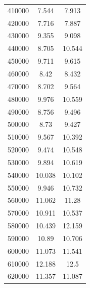 \documentclass{article}
\begin{document}
\begin{longtable}{c|c|c}
           410000 &                      7.544 &                      7.913 \\
           420000 &                      7.716 &                      7.887 \\
           430000 &                      9.355 &                      9.098 \\
           440000 &                      8.705 &                     10.544 \\
           450000 &                      9.711 &                      9.615 \\
           460000 &                      8.42  &                      8.432 \\
           470000 &                      8.702 &                      9.564 \\
           480000 &                      9.976 &                     10.559 \\
           490000 &                      8.756 &                      9.496 \\
           500000 &                      8.73  &                      9.427 \\
           510000 &                      9.567 &                     10.392 \\
           520000 &                      9.474 &                     10.548 \\
           530000 &                      9.894 &                     10.619 \\
           540000 &                     10.038 &                     10.102 \\
           550000 &                      9.946 &                     10.732 \\
           560000 &                     11.062 &                     11.28  \\
           570000 &                     10.911 &                     10.537 \\
           580000 &                     10.439 &                     12.159 \\
           590000 &                     10.89  &                     10.706 \\
           600000 &                     11.073 &                     11.541 \\
           610000 &                     12.188 &                     12.5   \\
           620000 &                     11.357 &                     11.087 \\

\end{longtable}
\end{document}
